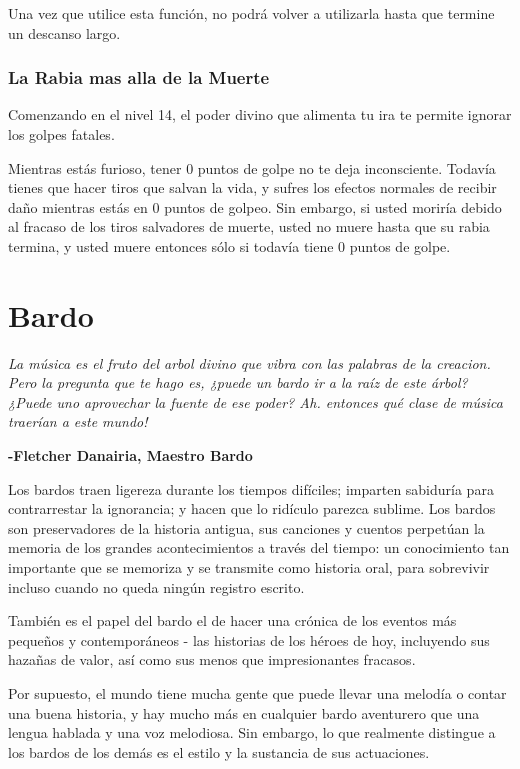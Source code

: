 \documentclass[a4paper,twocolumn,openany,10pt]{dndbook}
\begin{document}
Una vez que utilice esta función, no podrá volver a utilizarla hasta que termine un descanso largo.

\subsubsection{La Rabia mas alla de la Muerte}
Comenzando en el nivel 14, el poder divino que alimenta tu ira te permite ignorar los golpes fatales.

Mientras estás furioso, tener 0 puntos de golpe no te deja inconsciente. Todavía tienes que hacer tiros que salvan la vida, y sufres los
efectos normales de recibir daño mientras estás en 0 puntos de golpeo. Sin embargo, si usted moriría debido al fracaso de los tiros
salvadores de muerte, usted no muere hasta que su rabia termina, y usted muere entonces sólo si todavía tiene 0 puntos de golpe.

\section{Bardo}

\begin{quotebox}
	\textit{La música es el fruto del arbol divino que vibra con las palabras de la creacion. Pero la pregunta que te hago es, ¿puede un bardo ir
a la raíz de este árbol? ¿Puede uno aprovechar la fuente de ese poder? Ah. entonces qué clase de música traerían a este mundo!}

	\begin{flushright}
	\textbf{-Fletcher Danairia, Maestro Bardo}
	\end{flushright}
\end{quotebox}

Los bardos traen ligereza durante los tiempos difíciles; imparten sabiduría para contrarrestar la ignorancia; y hacen que lo ridículo parezca
sublime. Los bardos son preservadores de la historia antigua, sus canciones y cuentos perpetúan la memoria de los grandes acontecimientos a
través del tiempo: un conocimiento tan importante que se memoriza y se transmite como historia oral, para sobrevivir incluso cuando no queda
ningún registro escrito. 

También es el papel del bardo el de hacer una crónica de los eventos más pequeños y contemporáneos - las historias de los héroes de hoy,
incluyendo sus hazañas de valor, así como sus menos que impresionantes fracasos.

Por supuesto, el mundo tiene mucha gente que puede llevar una melodía o contar una buena historia, y hay mucho más en cualquier bardo
aventurero que una lengua hablada y una voz melodiosa. Sin embargo, lo que realmente distingue a los bardos de los demás es el estilo y la
sustancia de sus actuaciones.
\end{document}
